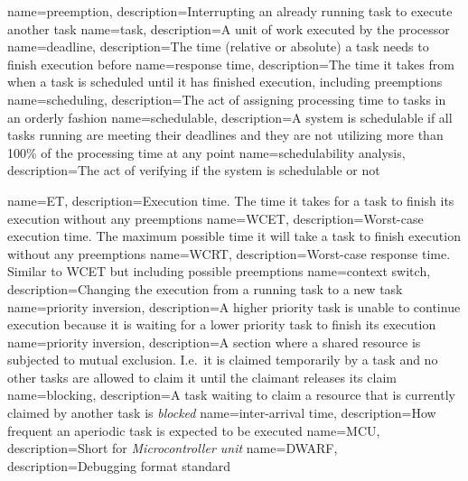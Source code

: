 {
    name=preemption,
    description={Interrupting an already running task to execute another task}
}
{
    name=task,
    description={A unit of work executed by the processor}
}
{
    name=deadline,
    description={The time (relative or absolute) a task needs to finish execution before}
}
{
    name=response time,
    description={The time it takes from when a task is scheduled until it has finished
    execution, including preemptions}
}
{
    name=scheduling,
    description={The act of assigning processing time to tasks in an orderly fashion}
}
{
    name=schedulable,
    description={A system is schedulable if all tasks running are meeting their
    deadlines and they are not utilizing more than 100\% of the processing time
    at any point}
}
{
    name=schedulability analysis,
    description={The act of verifying if the system is schedulable or not}
}

{
    name=ET,
    description={Execution time. The time it takes for a task to finish its execution
    without any preemptions}
}
{
    name=WCET,
    description={Worst-case execution time. The maximum possible time it will
    take a task to finish execution without any preemptions}
}
{
    name=WCRT,
    description={Worst-case response time. Similar to WCET but including possible
    preemptions}
}
{
    name=context switch,
    description={Changing the execution from a running task to a new task}
}
{
    name=priority inversion,
    description={A higher priority task is unable to continue execution because
    it is waiting for a lower priority task to finish its execution}
}
{
    name=priority inversion,
    description={A section where a shared resource is subjected to mutual exclusion.
    I.e.\ it is claimed temporarily by a task and no other tasks are allowed to claim
    it until the claimant releases its claim}
}
{
    name=blocking,
    description={A task waiting to claim a resource that is currently claimed
    by another task is \emph{blocked}}
}
{
    name=inter-arrival time,
    description={How frequent an aperiodic task is expected to be executed}
}
{
    name=MCU,
    description={Short for \emph{Microcontroller unit}}
}
{
    name=DWARF,
    description={Debugging format standard}
}
